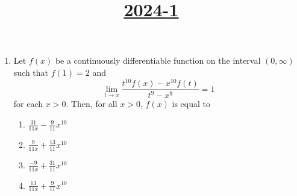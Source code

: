 \documentclass[12pt,a4paper]{article}
\title{\underline{\textbf{2024-1}}}
\date{}
\begin{document}
\maketitle
\begin{enumerate}
    \item Let $f(x)$ be a continuously differentiable function on the interval $(0,\infty)$ such that $f(1) = 2$ and 
\[
    \lim\limits_{t \to x} \frac{t^{10} f(x) - x^{10} f(t)}{t^9 - x^9} = 1
\]
    for each $x > 0$. Then, for all $x > 0$, $f(x)$ is equal to
    \begin{enumerate}
        \item $\frac{31}{11x} - \frac{9}{11} x^{10}$
        \item $\frac{9}{11x} + \frac{13}{11} x^{10}$
        \item $\frac{-9}{11x} + \frac{31}{11} x^{10}$       \item $\frac{13}{11x} + \frac{9}{11} x^{10}$
    \end{enumerate}
 

\end{enumerate}
\end{document}
